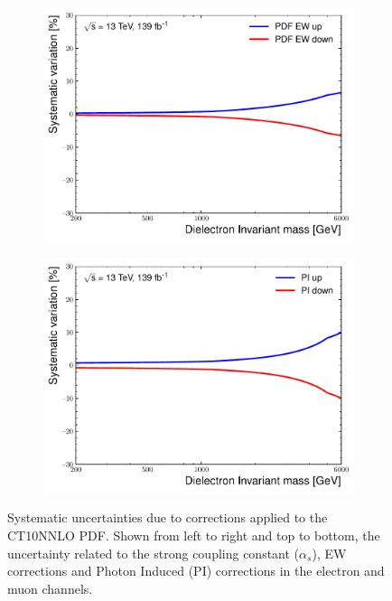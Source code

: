\begin{figure}[h!]
\begin{subfigure}[h]{0.42\textwidth}
        \includegraphics[width=\textwidth]{figures/analysis/datamc/Uncertainties/theory/ee/backgroundTemplate_KF_PDF_EW__1up.pdf}
        \label{fig:uncert:eeEW}
    \end{subfigure}
    \begin{subfigure}[h]{0.42\textwidth}
        \centering
        \includegraphics[width=\textwidth]{figures/analysis/datamc/Uncertainties/theory/ee/backgroundTemplate_KF_PI__1up.pdf}
        \label{fig:uncert:eePI}
    \end{subfigure}
    \caption{Systematic uncertainties due to corrections applied to the CT10NNLO PDF. Shown from left to right and top to bottom, the uncertainty related to the strong coupling constant ($\alpha_s$), EW corrections and Photon Induced (PI) corrections in the electron and muon channels.}
    \label{fig:uncert:theoryConstants}
\end{figure}
